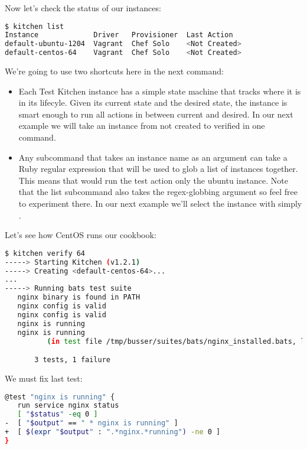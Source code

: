 Now let's check the status of our instances:

\begin{lstlisting}[language=Bash,label=lst:testing-test-kitchen21]
$ kitchen list
Instance             Driver   Provisioner  Last Action
default-ubuntu-1204  Vagrant  Chef Solo    <Not Created>
default-centos-64    Vagrant  Chef Solo    <Not Created>
\end{lstlisting}

We're going to use two shortcuts here in the next command:

\begin{itemize}
  \item Each Test Kitchen instance has a simple state machine that tracks where it is in its lifecyle. Given its current state and the desired state, the instance is smart enough to run all actions in between current and desired. In our next example we will take an instance from not created to verified in one command.
  \item Any  subcommand that takes an instance name as an argument can take a Ruby regular expression that will be used to glob a list of instances together. This means that  would run the test action only the ubuntu instance. Note that the list subcommand also takes the regex-globbing argument so feel free to experiment there. In our next example we'll select the  instance with simply .
\end{itemize}

Let's see how CentOS runs our cookbook:

\begin{lstlisting}[language=Bash,label=lst:testing-test-kitchen22]
$ kitchen verify 64
-----> Starting Kitchen (v1.2.1)
-----> Creating <default-centos-64>...
...
-----> Running bats test suite
   nginx binary is found in PATH
   nginx config is valid                                                    2/3
   nginx config is valid
   nginx is running                                                         3/3
   nginx is running
          (in test file /tmp/busser/suites/bats/nginx_installed.bats, line 16)

       3 tests, 1 failure
\end{lstlisting}

We must fix last test:

\begin{lstlisting}[language=Bash,label=lst:testing-test-kitchen23]
@test "nginx is running" {
   run service nginx status
   [ "$status" -eq 0 ]
-  [ "$output" == " * nginx is running" ]
+  [ $(expr "$output" : ".*nginx.*running") -ne 0 ]
}
\end{lstlisting}

